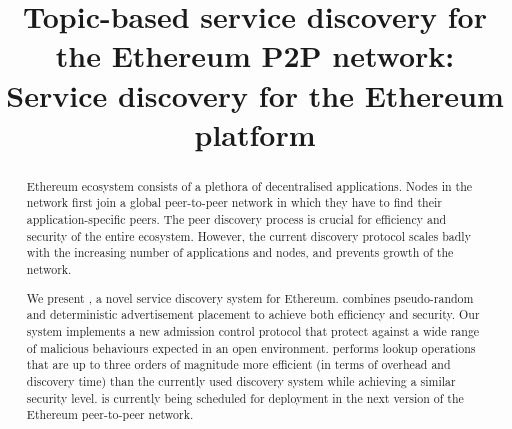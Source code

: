 \documentclass[conference]{IEEEtran}
\begin{document}
\title{Topic-based service discovery for the Ethereum P2P network}
\title{\sysname: Service discovery for the Ethereum platform}
\author{}
\maketitle

\begin{abstract}
Ethereum ecosystem consists of a plethora of decentralised applications. Nodes in the network first join a global peer-to-peer network in which they have to find their application-specific peers. The peer discovery process is crucial for efficiency and security of the entire ecosystem. However, the current discovery protocol scales badly with the increasing number of applications and nodes, and prevents growth of the network.

We present \sysname, a novel service discovery system for Ethereum. \sysname combines pseudo-random and deterministic advertisement placement to achieve both efficiency and security. Our system implements a new admission control protocol that protect against a wide range of malicious behaviours expected in an open environment. 
\sysname performs lookup operations that are up to three orders of magnitude more efficient (in terms of overhead and discovery time) than the currently used discovery system while achieving a similar security level. \sysname is currently being scheduled for deployment in the next version of the Ethereum peer-to-peer network. 

\end{abstract}


%


\end{document}
